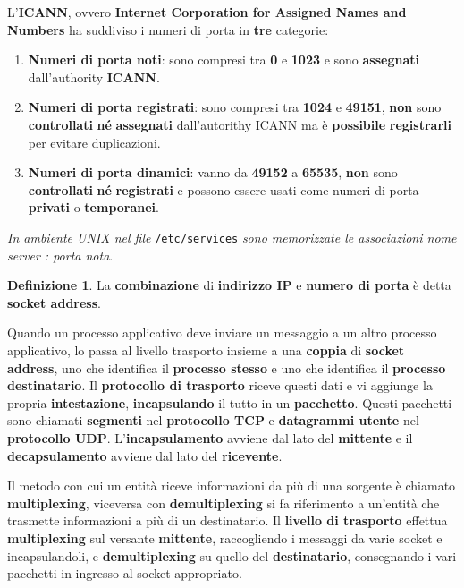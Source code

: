 \documentclass[11pt,a4paper,oneside]{book}
\theoremstyle{definition}
\newtheorem{definition}{Definizione}[section]
\begin{document}
\pagebreak

L'\textbf{ICANN}, ovvero \textbf{Internet Corporation for Assigned Names and Numbers} ha suddiviso i numeri di porta in \textbf{tre} categorie:
\begin{enumerate}
	\item \textbf{Numeri di porta noti}: sono compresi tra \textbf{0} e \textbf{1023} e sono \textbf{assegnati} dall'authority \textbf{ICANN}.
	\item \textbf{Numeri di porta registrati}: sono compresi tra \textbf{1024} e \textbf{49151}, \textbf{non} sono \textbf{controllati} \textbf{né} \textbf{assegnati} dall'autorithy ICANN ma è \textbf{possibile} \textbf{registrarli} per evitare duplicazioni.
	\item \textbf{Numeri di porta dinamici}: vanno da \textbf{49152} a \textbf{65535}, \textbf{non} sono \textbf{controllati} \textbf{né} \textbf{registrati} e possono essere usati come numeri di porta \textbf{privati} o \textbf{temporanei}.
\end{enumerate}
\textit{In ambiente UNIX nel file} \texttt{/etc/services} \textit{sono memorizzate le associazioni nome server : porta nota}.
\theoremstyle{definition}
\begin{definition}
	La \textbf{combinazione} di \textbf{indirizzo IP} e \textbf{numero di porta} è detta \textbf{socket address}.
\end{definition}
Quando un processo applicativo deve inviare un messaggio a un altro processo applicativo, lo passa al livello trasporto insieme a una \textbf{coppia} di \textbf{socket address}, uno che identifica il \textbf{processo stesso} e uno che identifica il \textbf{processo destinatario}. Il \textbf{protocollo di trasporto} riceve questi dati e vi aggiunge la propria \textbf{intestazione}, \textbf{incapsulando} il tutto in un \textbf{pacchetto}. Questi pacchetti sono chiamati \textbf{segmenti} nel \textbf{protocollo TCP} e \textbf{datagrammi utente} nel \textbf{protocollo UDP}. L'\textbf{incapsulamento} avviene dal lato del \textbf{mittente} e il \textbf{decapsulamento} avviene dal lato del \textbf{ricevente}.

Il metodo con cui un entità riceve informazioni da più di una sorgente è chiamato \textbf{multiplexing}, viceversa con \textbf{demultiplexing} si fa riferimento a un'entità che trasmette informazioni a più di un destinatario. Il \textbf{livello di trasporto} effettua \textbf{multiplexing} sul versante \textbf{mittente}, raccogliendo i messaggi da varie socket e incapsulandoli, e \textbf{demultiplexing} su quello del \textbf{destinatario}, consegnando i vari pacchetti in ingresso al socket appropriato.
\end{document}
